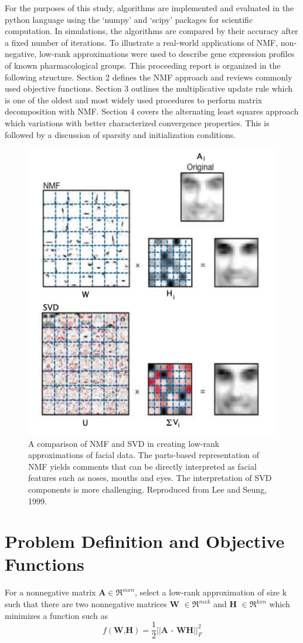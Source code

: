\documentclass[final,leqno,onefignum,onetabnum]{siamltex1213}
\begin{document}
For the purposes of this study, algorithms are implemented and evaluated in the python language using the `numpy' and `scipy' packages for scientific computation. In simulations, the algorithms are compared by their accuracy after a fixed number of iterations. To illustrate a real-world applications of NMF, non-negative, low-rank approximations were used to describe gene expression profiles of known pharmacological groups. This proceeding report is organized in the following structure. Section 2 defines the NMF approach and reviews commonly used objective functions. Section 3 outlines the multiplicative update rule which is one of the oldest and most widely used procedures to perform matrix decomposition with NMF. Section 4 covers the alternating least squares approach which variations with better characterized convergence properties. This is followed by a discussion of sparsity and initialization conditions. 

\begin{figure}[t!]
  \centering
    \includegraphics[width=.5\linewidth]{NMF_faces_Lee_Seung_1999}
  \caption{A comparison of NMF and SVD in creating low-rank approximations of facial data. The parts-based representation of NMF yields comments that can be directly interpreted as facial features such as noses, mouths and eyes. The interpretation of SVD components is more challenging. Reproduced from Lee and Seung, 1999.}
\end{figure}

\section{Problem Definition and Objective Functions}

\begin{definition} For a nonnegative matrix $\textbf{A} \in \Re^{m x n} $, select a low-rank approximation of size k such that there are two nonnegative matrices \textbf{W} $ \in \Re^{m x k}$ and \textbf{H} $ \in \Re^{k x n}$ which minimizes a function such as 
\begin{equation}\label{ObjEuc}
 f( \textbf{W,H}) = \frac{1}{2} || \textbf{A - WH} || ^{2}_{F}
\end{equation}

\end{definition}
\end{document}

